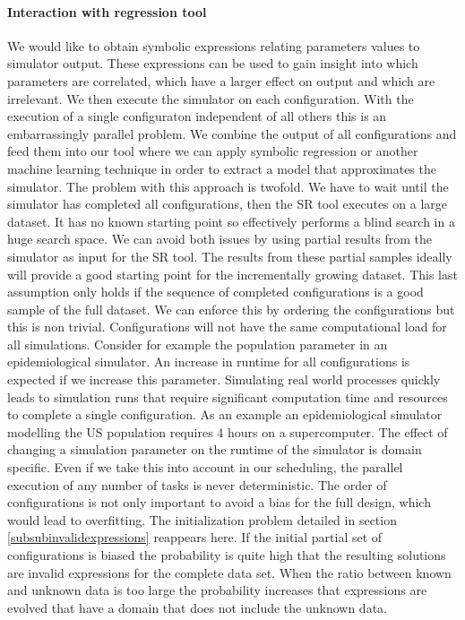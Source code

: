 \paragraph{Interaction with regression tool}
We would like to obtain symbolic expressions relating parameters values to simulator output. These expressions can be used to gain insight into which parameters are correlated, which have a larger effect on output and which are irrelevant. 
We then execute the simulator on each configuration. With the execution of a single configuraton independent of all others this is an embarrassingly parallel problem. We combine the output of all configurations and feed them into our tool where we can apply symbolic regression or another machine learning technique in order to extract a model that approximates the simulator. The problem with this approach is twofold. We have to wait until the simulator has completed all configurations, then the SR tool executes on a large dataset. It has no known starting point so effectively performs a blind search in a huge search space. We can avoid both issues by using partial results from the simulator as input for the SR tool. The results from these partial samples ideally will provide a good starting point for the incrementally growing dataset. This last assumption only holds if the sequence of completed configurations is a good sample of the full dataset. We can enforce this by ordering the configurations but this is non trivial. Configurations will not have the same computational load for all simulations. Consider for example the population parameter in an epidemiological simulator. An increase in runtime for all configurations is expected if we increase this parameter. Simulating real world processes quickly leads to simulation runs that require significant computation time and resources to complete a single configuration. As an example an epidemiological simulator modelling the US population \cite{FRED} requires 4 hours on a supercomputer. The effect of changing a simulation parameter on the runtime of the simulator is domain specific.
Even if we take this into account in our scheduling, the parallel execution of any number of tasks is never deterministic. The order of configurations is not only important to avoid a bias for the full design, which would lead to overfitting. The initialization problem detailed in section \ref{subsubinvalidexpressions} reappears here. If the initial partial set of configurations is biased the probability is quite high that the resulting solutions are invalid expressions for the complete data set. When the ratio between known and unknown data is too large the probability increases that expressions are evolved that have a domain that does not include the unknown data.

